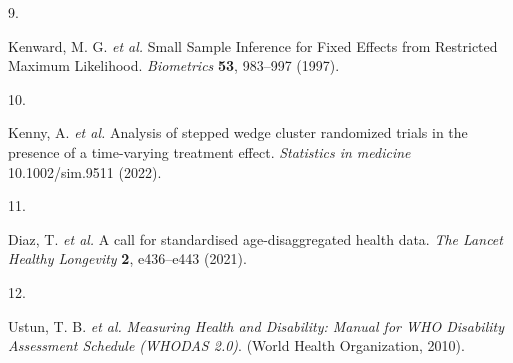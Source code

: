 \documentclass[
]{scrartcl}
\newlength{\cslhangindent}
\newlength{\csllabelwidth}
\newlength{\cslentryspacingunit} %
\newenvironment{CSLReferences}[2] %
 {%
  \setlength{\parindent}{0pt}
  \ifodd #1
  \let\oldpar\par
  \def\par{\hangindent=\cslhangindent\oldpar}
  \fi
  \setlength{\parskip}{#2\cslentryspacingunit}
 }%
 {}
\newcommand{\CSLLeftMargin}[1]{\parbox[t]{\csllabelwidth}{#1}}
\newcommand{\CSLRightInline}[1]{\parbox[t]{\linewidth - \csllabelwidth}{#1}\break}
\begin{document}
\begin{CSLReferences}{0}{0}
\leavevmode{}%
\CSLLeftMargin{9. }%
\CSLRightInline{Kenward, M. G. \emph{et al.} Small {Sample} {Inference}
for {Fixed} {Effects} from {Restricted} {Maximum} {Likelihood}.
\emph{Biometrics} \textbf{53}, 983--997 (1997).}

\leavevmode{}%
\CSLLeftMargin{10. }%
\CSLRightInline{Kenny, A. \emph{et al.} Analysis of stepped wedge
cluster randomized trials in the presence of a time-varying treatment
effect. \emph{Statistics in medicine} 10.1002/sim.9511 (2022).}

\leavevmode{}%
\CSLLeftMargin{11. }%
\CSLRightInline{Diaz, T. \emph{et al.} A call for standardised
age-disaggregated health data. \emph{The Lancet Healthy Longevity}
\textbf{2}, e436--e443 (2021).}

\leavevmode{}%
\CSLLeftMargin{12. }%
\CSLRightInline{Ustun, T. B. \emph{et al.} \emph{Measuring {Health} and
{Disability}: {Manual} for {WHO} {Disability} {Assessment} {Schedule}
({WHODAS} 2.0)}. (World Health Organization, 2010).}

\end{CSLReferences}
\end{document}

